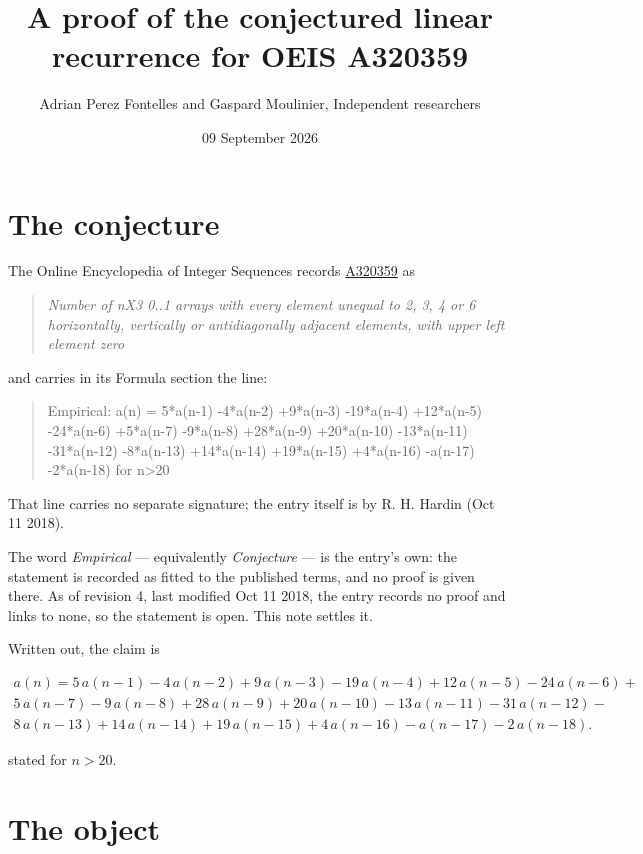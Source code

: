 \documentclass[11pt]{article}
\title{A proof of the conjectured linear recurrence for OEIS A320359}
\author{Adrian Perez Fontelles and Gaspard Moulinier, Independent researchers}
\date{09 September 2026}
\theoremstyle{definition}
\begin{document}
\maketitle
\section{The conjecture}

The Online Encyclopedia of Integer Sequences records \href{https://oeis.org/A320359}{A320359} as

\begin{quote}\itshape Number of nX3 0..1 arrays with every element unequal to 2, 3, 4 or 6 horizontally, vertically or antidiagonally adjacent elements, with upper left element zero\end{quote}

and carries in its Formula section the line:

\begin{quote}\ttfamily Empirical: a(n) = 5*a(n-1) -4*a(n-2) +9*a(n-3) -19*a(n-4) +12*a(n-5) -24*a(n-6) +5*a(n-7) -9*a(n-8) +28*a(n-9) +20*a(n-10) -13*a(n-11) -31*a(n-12) -8*a(n-13) +14*a(n-14) +19*a(n-15) +4*a(n-16) -a(n-17) -2*a(n-18) for n>20\end{quote}

That line carries no separate signature; the entry itself is by R. H. Hardin (Oct 11 2018).

The word {\itshape Empirical} --- equivalently {\itshape Conjecture} --- is the entry's own: the statement is recorded as fitted to the published terms, and no proof is given there. As of revision 4, last modified Oct 11 2018, the entry records no proof and links to none, so the statement is open. This note settles it.

Written out, the claim is

\begin{multline*} a(n) = 5\,a(n-1) - 4\,a(n-2) + 9\,a(n-3) - 19\,a(n-4) + 12\,a(n-5) - 24\,a(n-6) + \\ 5\,a(n-7) - 9\,a(n-8) + 28\,a(n-9) + 20\,a(n-10) - 13\,a(n-11) - 31\,a(n-12) - \\ 8\,a(n-13) + 14\,a(n-14) + 19\,a(n-15) + 4\,a(n-16) - a(n-17) - 2\,a(n-18). \end{multline*}

stated for $n > 20$.

\section{The object}
\end{document}
